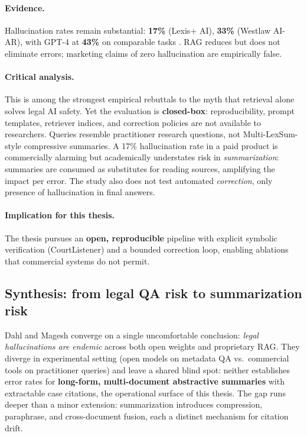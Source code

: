 \paragraph{Evidence.}
Hallucination rates remain substantial: \textbf{17\%} (Lexis+ AI), \textbf{33\%} (Westlaw AI-AR), with GPT-4 at \textbf{43\%} on comparable tasks \cite{magesh2025hallucinationfree}. RAG reduces but does not eliminate errors; marketing claims of zero hallucination are empirically false.

\paragraph{Critical analysis.}
This is among the strongest empirical rebuttals to the myth that retrieval alone solves legal AI safety. Yet the evaluation is \textbf{closed-box}: reproducibility, prompt templates, retriever indices, and correction policies are not available to researchers. Queries resemble practitioner research questions, not Multi-LexSum-style compressive summaries. A 17\% hallucination rate in a paid product is commercially alarming but academically understates risk in \emph{summarization}: summaries are consumed as substitutes for reading sources, amplifying the impact per error. The study also does not test automated \emph{correction}, only presence of hallucination in final answers.

\paragraph{Implication for this thesis.}
The thesis pursues an \textbf{open, reproducible} pipeline with explicit symbolic verification (CourtListener) and a bounded correction loop, enabling ablations that commercial systems do not permit.

\subsection{Synthesis: from legal QA risk to summarization risk}

Dahl and Magesh converge on a single uncomfortable conclusion: \emph{legal hallucinations are endemic} across both open weights and proprietary RAG. They diverge in experimental setting (open models on metadata QA vs.\ commercial tools on practitioner queries) and leave a shared blind spot: neither establishes error rates for \textbf{long-form, multi-document abstractive summaries} with extractable case citations, the operational surface of this thesis. The gap runs deeper than a minor extension: summarization introduces compression, paraphrase, and cross-document fusion, each a distinct mechanism for citation drift.
